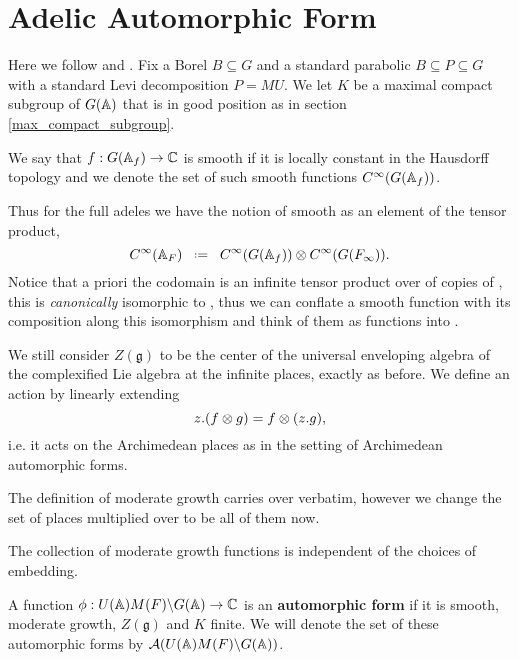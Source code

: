 \section{Adelic Automorphic Form}
Here we follow \cite[I.2.17]{moeglinSpectralDecompositionEisenstein1995} and \cite[1.2]{borelAutomorphicFormsRepresentations1979}. Fix a Borel \(B\subseteq G\) and a standard parabolic \(B\subseteq P \subseteq G\) with a standard Levi decomposition \(P = MU\). We let \(K\) be a maximal compact subgroup of \(G(\A)\) that is in good position as in section \ref{max_compact_subgroup}.

We say that \(f: G(\A_f) \to \C\) is smooth if it is locally constant in the Hausdorff topology and we denote the set of such smooth functions \(C^\infty(G(\A_f))\).

	Thus for the full adeles we have the notion of smooth as an element of the tensor product,
	\[C^\infty(\mathbb{A}_F) \defeq   C^\infty(G(\mathbb{A}_f))   \otimes   C^\infty(G(F_\infty)).\]
	Notice that a priori the codomain is an infinite tensor product over \C of copies of \C, this is \textit{canonically} isomorphic to \C, thus we can conflate a smooth function with its composition along this isomorphism and think of them as functions into \C.

	We still consider \(Z(\mathfrak{g})\) to be the center of the universal enveloping algebra of the complexified Lie algebra at the infinite places, exactly as before. We define an action by linearly extending
    \[z.(f\otimes g) = f\otimes (z.g),\]
    i.e. it acts on the Archimedean places as in the setting of Archimedean automorphic forms. 
	
	The definition of moderate growth carries over verbatim, however we change the set of places multiplied over to be all of them now.
    
    \begin{remark}
        The collection of moderate growth functions is independent of the choices of embedding. 
    \end{remark}

\begin{definition}
    A function \(\phi: U(\A)M(F)\backslash G(\A) \to \C\) is an \textbf{automorphic form} if it is smooth, moderate growth, \(Z(\mathfrak{g})\) and \(K\) finite. We will denote the set of these automorphic forms by \(\mathcal{A}(U(\A)M(F)\backslash G(\A))\).
\end{definition}

